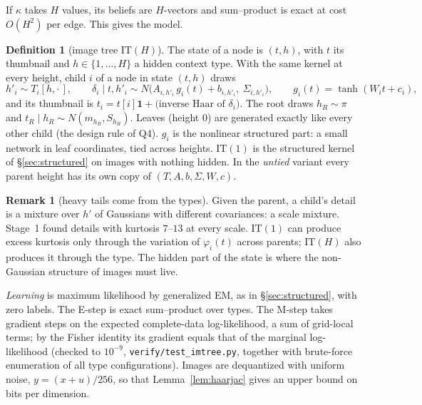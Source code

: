 \documentclass[11pt]{article}
\theoremstyle{definition}
\newtheorem{definition}[theorem]{Definition}
\newtheorem{remark}[theorem]{Remark}
\begin{document}
\noindent If $\kappa$ takes $H$ values, its beliefs are $H$-vectors and sum--product is exact at cost $O(H^2)$ per
edge. This gives the model.

\begin{definition}[image tree $\mathrm{IT}(H)$]\label{def:imtree}
The state of a node is $(t,h)$, with $t$ its thumbnail and $h\in\{1,\dots,H\}$ a hidden context type. With the
same kernel at every height, child $i$ of a node in state $(t,h)$ draws
\[
h'_i\sim T_i[h,\cdot\,],\qquad
\delta_i\mid t,h'_i\sim N\big(A_{i,h'_i}\,g_i(t)+b_{i,h'_i},\ \Sigma_{i,h'_i}\big),\qquad g_i(t)=\tanh(W_it+c_i),
\]
and its thumbnail is $t_i=t[i]\mathbf 1+\text{(inverse Haar of $\delta_i$)}$. The root draws $h_R\sim\pi$ and
$t_R\mid h_R\sim N(m_{h_R},S_{h_R})$. Leaves (height 0) are generated exactly like every other child (the
design rule of Q4). $g_i$ is the nonlinear structured part: a small network in leaf coordinates, tied across
heights. $\mathrm{IT}(1)$ is the structured kernel of \S\ref{sec:structured} on images with nothing hidden. In
the \emph{untied} variant every parent height has its own copy of $(T,A,b,\Sigma,W,c)$.
\end{definition}

\begin{remark}[heavy tails come from the types]\label{rem:gsm}
Given the parent, a child's detail is a mixture over $h'$ of Gaussians with different covariances: a scale
mixture. Stage~1 found details with kurtosis $7$--$13$ at every scale. $\mathrm{IT}(1)$ can produce excess
kurtosis only through the variation of $\varphi_i(t)$ across parents; $\mathrm{IT}(H)$ also produces it through
the type. The hidden part of the state is where the non-Gaussian structure of images must live.
\end{remark}

\noindent\emph{Learning} is maximum likelihood by generalized EM, as in \S\ref{sec:structured}, with zero labels.
The E-step is exact sum--product over types. The M-step takes gradient steps on the expected complete-data
log-likelihood, a sum of grid-local terms; by the Fisher identity its gradient equals that of the marginal
log-likelihood (checked to $10^{-9}$, \texttt{verify/test\_imtree.py}, together with brute-force enumeration of
all type configurations). Images are dequantized with uniform noise, $y=(x+u)/256$, so that
Lemma~\ref{lem:haarjac} gives an upper bound on bits per dimension.
\end{document}
